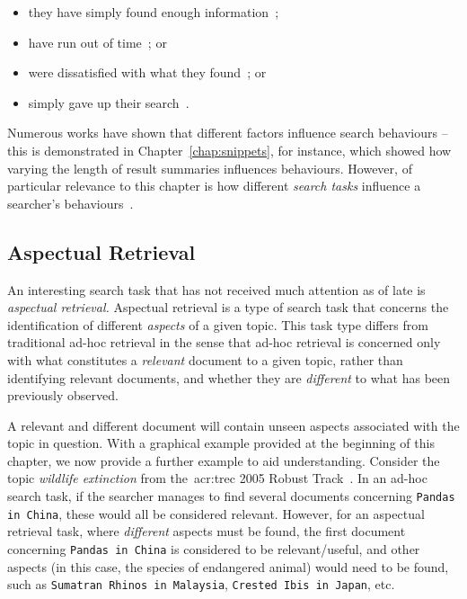 \begin{itemize}
    \item{they have simply found enough information~\citep{prabha2007enough, dostert2009satisficing, hassan2013beyond_clicks};}
    \item{have run out of time~\citep{zach2005enough_is_enough}; or}
    \item{were dissatisfied with what they found~\citep{kiseleva2015serp_fails}; or}
    \item{simply gave up their search~\citep{diriye2012abandonment}.}
\end{itemize}

Numerous works have shown that different factors influence search behaviours -- this is demonstrated in Chapter~\ref{chap:snippets}, for instance, which showed how varying the length of result summaries influences behaviours. However, of particular relevance to this chapter is how different \emph{search tasks} influence a searcher's behaviours~\citep{kelly2015search_tasks}.

\subsection{Aspectual Retrieval}
An interesting search task that has not received much attention as of late is \emph{aspectual retrieval.} Aspectual retrieval is a type of search task that concerns the identification of different \emph{aspects} of a given topic. This task type differs from traditional ad-hoc retrieval in the sense that ad-hoc retrieval is concerned only with what constitutes a \emph{relevant} document to a given topic, rather than identifying relevant documents, and whether they are \emph{different} to what has been previously observed.

A relevant and different document will contain unseen aspects associated with the topic in question. With a graphical example provided at the beginning of this chapter, we now provide a further example to aid understanding. Consider the topic \emph{wildlife extinction} from the~\gls{acr:trec} 2005 Robust Track~\citep{voorhees2006trec_robust}. In an ad-hoc search task, if the searcher manages to find several documents concerning \texttt{Pandas in China}, these would all be considered relevant. However, for an aspectual retrieval task, where \emph{different} aspects must be found, the first document concerning \texttt{Pandas in China} is considered to be relevant/useful, and other aspects (in this case, the species of endangered animal) would need to be found, such as \texttt{Sumatran Rhinos in Malaysia}, \texttt{Crested Ibis in Japan}, etc.

